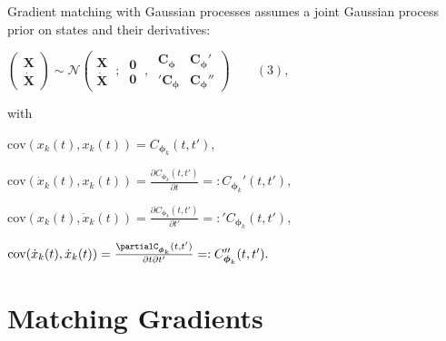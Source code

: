 \begin{par}
\begin{par}
Gradient matching with Gaussian processes assumes a joint Gaussian process prior on states and their derivatives:
\end{par} \vspace{1em}
\begin{par}
$\left(\begin{array}{c} \mathbf{X} \\ \dot{\mathbf{X}} \end{array}\right) \sim \mathcal{N} \left(\begin{array}{c} \mathbf{X} \\ \dot{\mathbf{X}} \end{array}~;~\begin{array}{c} \mathbf{0} \\\mathbf{0} \end{array}~,~\begin{array}{cc} \mathbf{C}_{\boldsymbol\phi} & \mathbf{C}_{\boldsymbol\phi}' \\ '\mathbf{C}_{\boldsymbol\phi} & \mathbf{C}_{\boldsymbol\phi}'' \end{array} \right) \qquad (3),$
\end{par} \vspace{1em}
\begin{par}
with
\end{par} \vspace{1em}
\begin{par}
$\mathrm{cov}(x_k(t), x_k(t)) = C_{\boldsymbol\phi_k}(t,t'),$
\end{par} \vspace{1em}
\begin{par}
$\mathrm{cov}(\dot{x}_k(t), x_k(t)) = \frac{\partial C_{\boldsymbol{\phi}_k}(t,t')}{\partial t} =: C_{{\boldsymbol\phi}_k}'(t,t'),$
\end{par} \vspace{1em}
\begin{par}
$\mathrm{cov}(x_k(t), \dot{x}_k(t)) = \frac{\partial C_{\boldsymbol\phi_k}(t,t')}{\partial t'} =: {'C_{\boldsymbol\phi_k}(t,t')},$
\end{par} \vspace{1em}
\begin{par}
$\mathrm{cov}(\dot{x}_k(t), \dot{x}_k(t)) = \frac{\partialC_{\boldsymbol\phi_k}(t,t') }{\partial t \partial t'} =: C_{\boldsymbol\phi_k}''(t,t').$
\end{par} \vspace{1em}


\section{Matching Gradients}


\end{par}
